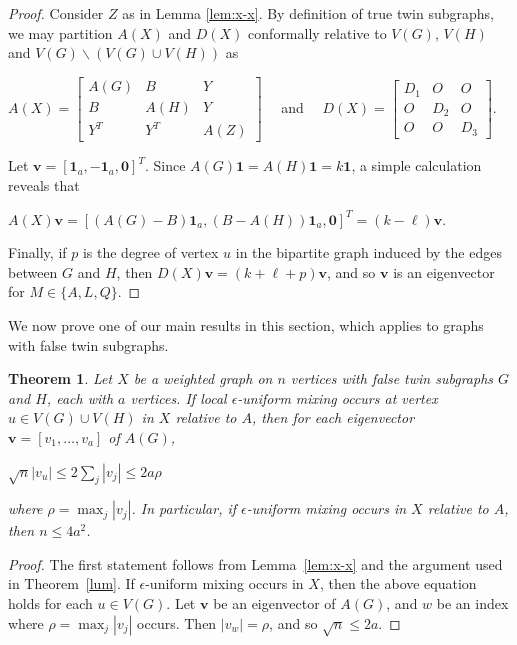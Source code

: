 \documentclass[11pt]{article}
\newtheorem{theorem}{Theorem}
\newcommand{\bv}{\mathbf v}
\newcommand{\one}{\mathbf 1}
\newcommand{\zero}{\mathbf 0}
\begin{document}
\begin{proof}
Consider $Z$ as in Lemma \ref{lem:x-x}. By definition of true twin subgraphs, we may partition $A(X)$ and $D(X)$ conformally relative to $V(G)$, $V(H)$ and $V(G)\backslash (V(G)\cup V(H))$ as
\begin{center}
$A(X)=\begin{bmatrix}A(G)&B&Y \\  B&A(H)&Y\\ Y^T&Y^T&A(Z)\end{bmatrix}\quad $ and $\quad D(X)=\begin{bmatrix}D_1&O&O \\  O&D_2&O\\ O&O&D_3\end{bmatrix}$.
\end{center}
Let $\bv=[\one_a ,-\one_a ,\zero]^T$. Since $A(G)\one=A(H)\one=k\one$, a simple calculation reveals that 
\begin{center}
 $A(X)\bv=[(A(G)-B)\one_a,(B-A(H))\one_a,\zero]^T=(k-\ell)\bv$.
\end{center}
Finally, if $p$ is the degree of vertex $u$ in the bipartite graph induced by the edges between $G$ and $H$, then $D(X)\bv=(k+\ell+p)\bv$, and so $\bv$ is an eigenvector for $M\in\{A,L,Q\}$.
\end{proof}

We now prove one of our main results in this section, which applies to graphs with false twin subgraphs.


\begin{theorem}
\label{regtwinsubg}
Let $X$ be a weighted graph on $n$ vertices with false twin subgraphs $G$ and $H$, each with $a$ vertices. If local $\epsilon$-uniform mixing occurs at vertex $u\in V(G)\cup V(H)$ in $X$ relative to $A$, then for each eigenvector $\mathbf{v}=[v_1,\ldots,v_a]$ of $A(G)$,
\begin{center}
$\displaystyle\sqrt{n}|v_u|\leq 2\sum_{j}|v_j|\leq 2a\rho$
\end{center}
where $\rho=\max_{j}|v_j|$. In particular, if $\epsilon$-uniform mixing occurs in $X$ relative to $A$, then $n\leq 4a^2$.
\end{theorem}

\begin{proof}
The first statement follows from Lemma~\ref{lem:x-x} and the argument used in Theorem~\ref{lum}. If $\epsilon$-uniform mixing occurs in $X$, then the above equation holds for each $u\in V(G)$. Let $\mathbf{v}$ be an eigenvector of $A(G)$, and $w$ be an index where $\rho=\max_j|v_j|$ occurs. Then $|v_w|=\rho$, and so $\sqrt{n}\leq 2a.$
\end{proof}
\end{document}
